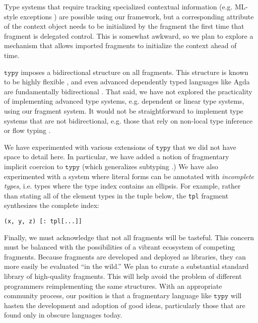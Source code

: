 \documentclass[preprint,10pt]{sigplanconf}
\newcommand{\typy}{\texttt{typy}}
\newcommand{\lip}[1]{\lstinline[language=Python,basicstyle=\ttfamily\footnotesize,deletendkeywords={tuple,buffer,map}]{#1}}
\newcommand{\li}[1]{\lip{#1}}
\begin{document}
Type systems that require tracking specialized contextual information (e.g. ML-style exceptions \cite{pfpl,harper1997programming}) are possible using our framework, but a corresponding attribute of the context object needs to be initialized by the fragment the first time that fragment is delegated control. This is somewhat awkward, so we plan to explore a mechanism that allows imported fragments to initialize the context ahead of time. 

$\typy$ imposes a bidirectional structure on all fragments. This structure is known to be highly flexible \cite{conf/icfp/DunfieldK13}, and even advanced dependently typed languages like Agda are fundamentally bidirectional \cite{norell2007towards}. That said, we have not explored the practicality of implementing advanced type systems, e.g. dependent or linear type systems, using our fragment system.  It would not be straightforward to implement type systems that are not bidirectional, e.g. those that rely on non-local type inference or flow typing \cite{Flow}. 

We have experimented with various extensions of $\typy$ that we did not have space to detail here. In particular, we have added a notion of fragmentary implicit coercion to $\typy$ (which generalizes subtyping \cite{DBLP:journals/iandc/Breazu-TannenCGS91}.) We have also experimented with a system where literal forms can be annotated with \emph{incomplete types}, i.e. types where the type index contains an ellipsis. For example, rather than stating all of the element types in the tuple below, the \li{tpl} fragment synthesizes the complete index:
\begin{lstlisting}[numbers=none]
(x, y, z) [: tpl[...]]
\end{lstlisting}

Finally, we must acknowledge that not all fragments will be tasteful. This concern must be balanced with the possibilities of a vibrant ecosystem of competing fragments. Because fragments are developed and deployed as libraries, they can more easily be evaluated ``in the wild.'' We plan to curate a substantial standard library of high-quality fragments. This will help avoid the problem of different programmers reimplementing the same structures. With an appropriate community process, our position is that a fragmentary language like $\typy$ will hasten the development and adoption of good ideas, particularly those that are found only in obscure languages today.


\end{document}
